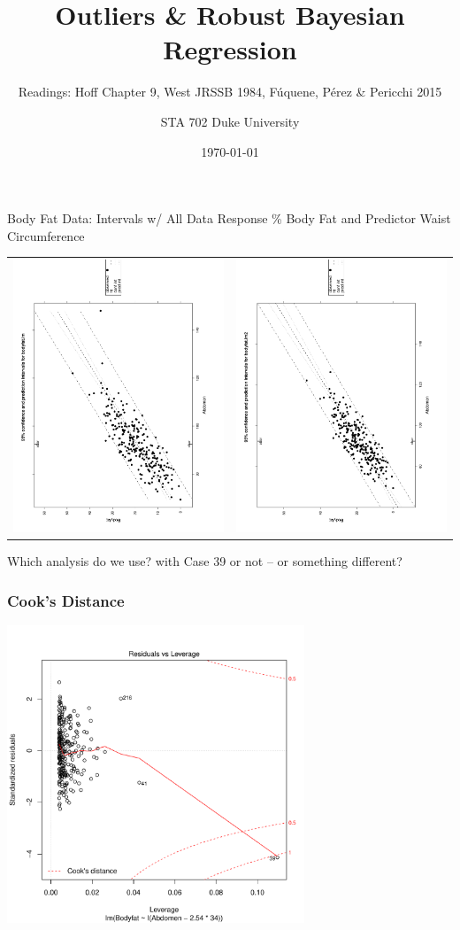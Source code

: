 \documentclass[handout]{beamer}
\title{Outliers \& Robust Bayesian  Regression}
\author{STA 702 Duke University}
\subtitle{Readings: Hoff Chapter 9, West JRSSB 1984, F{\'{u}}quene,
    P{\'e}rez \& Pericchi 2015}
\institute{Duke University}
\date{\today}
\begin{document}

\maketitle

\begin{frame}{Body Fat Data: Intervals w/ All Data}
Response \% Body Fat and Predictor Waist Circumference

  \begin{tabular}{cc}
{\includegraphics[height=2.in,angle=270]{pred}} &
{\includegraphics[height=2.in,angle=270]{pred-sub}}
  \end{tabular}

  Which analysis do we use?  with Case 39 or not -- or something different?


\end{frame}  \begin{frame} \frametitle{Cook's Distance}

{\includegraphics[height=3.5in]{CooksD}}

\end{frame}
\end{document}
